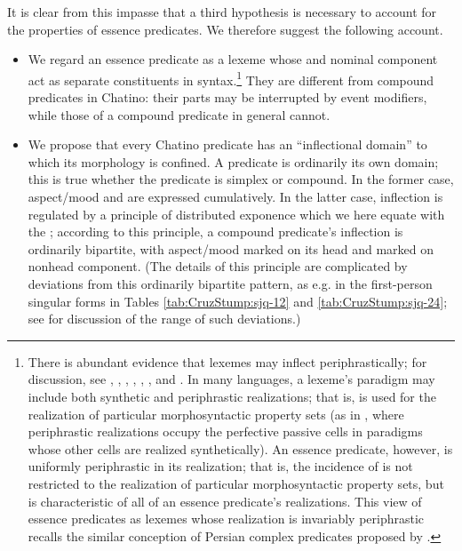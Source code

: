 \documentclass[output=paper]{langsci/langscibook}
\begin{document}
It is clear from this impasse that a third hypothesis is necessary to account for the properties of essence predicates.  We therefore suggest the following account.
\begin{itemize}
\item We regard an essence predicate as a lexeme whose  and nominal component act as separate constituents in syntax.\footnote{There is abundant evidence that 
lexemes may inflect periphrastically; for discussion, see \cite{BoerjarsEtAl}, \cite{Sadler:Spencer01}, \cite{AckermanStump}, \cite{AckermanStumpWebelhuth}, \cite{SurreyPeriphrasis}, \cite{BonamiSamvelian}, and \cite{BonamiPeriphrasis}.  In many languages, a lexeme's paradigm may include both synthetic and periphrastic realizations; that is,  is used for the realization of particular morphosyntactic property sets (as in , where periphrastic realizations occupy the perfective passive cells in paradigms whose other cells are realized synthetically).  An essence predicate, however, is uniformly periphrastic in its realization; that is, the incidence of  is not restricted to the realization of particular morphosyntactic property sets, but is characteristic of all of an essence predicate's realizations.  This view of essence predicates as lexemes whose realization is invariably periphrastic recalls the similar conception of Persian complex predicates proposed by \cite{BonamiSamvelianComplexPreds}.}  They are different from compound predicates in Chatino:  their parts may be interrupted by event modifiers, while those of a compound predicate in general cannot. 
 \item We propose that every Chatino predicate has an ``inflectional domain'' to which its  morphology is confined.  A predicate is ordinarily its own domain; this is true whether the predicate is simplex or compound.  In the former case, aspect/mood and  are expressed cumulatively.  In the latter case, inflection is regulated by a principle of distributed exponence which we here equate with the ; according to this principle, a compound predicate's inflection is ordinarily bipartite, with aspect/mood marked on its head and  marked on nonhead component.  (The details of this principle are complicated by deviations from this ordinarily bipartite pattern, as e.g. in the first-person singular forms in Tables \ref{tab:CruzStump:sjq-12} and \ref{tab:CruzStump:sjq-24}; see \cite{CruzWoodbury2013} for discussion of the range of such deviations.)

\end{itemize}
\end{document}

